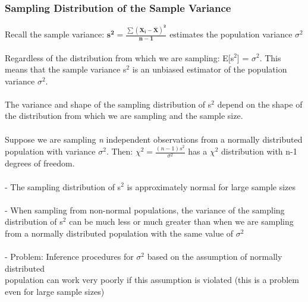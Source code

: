 \documentclass[12pt, a4paper]{article}
\begin{document}
	\subsubsection{Sampling Distribution of the Sample Variance}
	Recall the sample variance: $\bm{s^2 = \frac{\sum(X_i-\bar{X})^2}{n-1}}$ estimates the population variance $\sigma^2$ \\~\\
	Regardless of the distribution from which we are sampling: E[s$^2$] = $\sigma^2$. This means that the sample variance s$^2$ is an unbiased estimator of the population variance $\sigma^2$. \\~\\
	The variance and shape of the sampling distribution of s$^2$ depend on the shape of the distribution from which we are sampling and the sample size. \\~\\
	Suppose we are sampling \textit{n} independent observations from a normally distributed population with variance $\sigma^2$. Then: $\chi^2 = \frac{(n-1)s^2}{\sigma^2}$ has a $\chi^2$ distribution with n-1 degrees of freedom. \\~\\
	- The sampling distribution of s$^2$ is approximately normal for large sample sizes \\~\\
	- When sampling from non-normal populations, the variance of the sampling distribution of \hspace*{2mm} s$^2$ can be much less or much greater than when we are sampling from a normally distributed \hspace*{2mm} population with the same value of $\sigma^2$ \\~\\
	- Problem: Inference procedures for $\sigma^2$ based on the assumption of normally distributed\\ \hspace*{2mm} population can work very poorly if this assumption is violated (this is a problem even for \hspace*{2mm} large sample sizes) \\~\\
	
\end{document}
